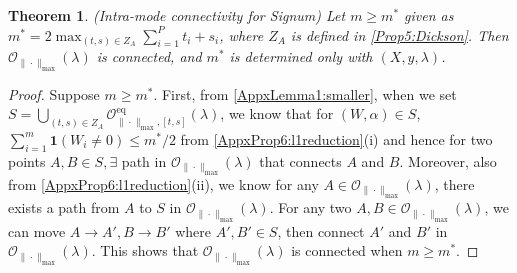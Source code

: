 \documentclass{article}
\newtheorem{theorem}{Theorem}[section]
\newcommand{\eq}{\mathrm{eq}}      %
\begin{document}
\begin{theorem}   
\label{Appxt2:intra_signum}
(Intra-mode connectivity for Signum) Let $m \geq m^*$ given as $m^* = 2 \max_{(t,s) \in Z_A} \sum_{i=1}^P t_i+s_i$, where $Z_A$ is defined in \cref{Prop5:Dickson}. Then $\mathcal{O}_{\| \cdot \|_{\max}}(\lambda)$ is connected, and $m^*$ is determined only with $(X, y, \lambda)$.
\end{theorem}
\begin{proof}
Suppose $m \geq m^*$. First, from \cref{AppxLemma1:smaller}, when we set $S = \bigcup_{(t,s) \in Z_A} \mathcal{O}_{\|\cdot\|_{\max}, [t,s]}^{\eq}(\lambda)$, we know that for $(W, \alpha) \in S$, $\sum_{i=1}^m \mathbf{1}(W_i \neq 0) \leq m^*/2$ from \cref{AppxProp6:l1reduction}(i) and hence for two points $A, B \in S, \exists$ path in $\mathcal{O}_{\|\cdot\|_{\max}}(\lambda)$ that connects $A$ and $B$. Moreover, also from \cref{AppxProp6:l1reduction}(ii), we know for any $A \in \mathcal{O}_{\|\cdot\|_{\max}}(\lambda)$, there exists a path from $A$ to $S$ in $\mathcal{O}_{\|\cdot\|_{\max}}(\lambda)$. For any two $A, B \in \mathcal{O}_{\|\cdot\|_{\max}}(\lambda)$, we can move $A \rightarrow A', B \rightarrow B'$ where $A', B' \in S$, then connect $A'$ and $B'$ in $\mathcal{O}_{\|\cdot\|_{\max}}(\lambda)$. This shows that $\mathcal{O}_{\|\cdot\|_{\max}}(\lambda)$ is connected when $m \geq m^*$.
\end{proof}
\end{document}
